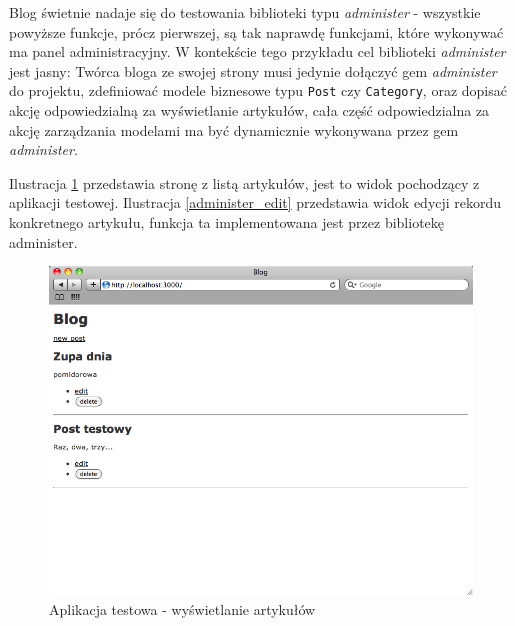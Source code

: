   Blog świetnie nadaje się do testowania biblioteki typu \emph{administer} - wszystkie powyższe funkcje, prócz pierwszej, są tak naprawdę funkcjami, które wykonywać ma panel administracyjny. W kontekście tego przykładu cel biblioteki \emph{administer} jest jasny: Twórca bloga ze swojej strony musi jedynie dołączyć gem \emph{administer} do projektu, zdefiniować modele biznesowe typu \texttt{Post} czy \texttt{Category}, oraz dopisać akcję odpowiedzialną za wyświetlanie artykułów, cała część odpowiedzialna za akcję zarządzania modelami ma być dynamicznie wykonywana przez gem \emph{administer}. 
  
  Ilustracja \ref{blog_view} przedstawia stronę z listą artykułów, jest to widok pochodzący z aplikacji testowej. Ilustracja \ref{administer_edit} przedstawia widok edycji rekordu konkretnego artykułu, funkcja ta implementowana jest przez bibliotekę administer.
  
  \begin{figure}[!h]
		\begin{center}
			\includegraphics[width=\linewidth]{images/blog.png}
			\caption{Aplikacja testowa - wyświetlanie artykułów}
			\label{blog_view}
		\end{center}
	\end{figure}
	
	\clearpage
	
